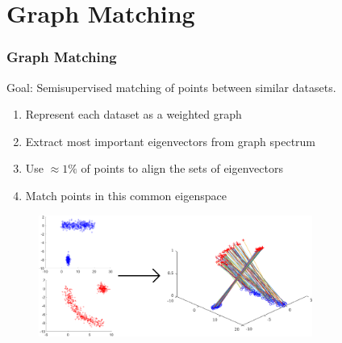 \documentclass{beamer}
\begin{document}
\section{Graph Matching}
\begin{frame}
  \frametitle{Graph Matching}
  Goal: Semisupervised matching of points between similar datasets.\\
  \begin{enumerate}
  \item Represent each dataset as a weighted graph
  \item Extract most important eigenvectors from graph spectrum
  \item Use $\approx 1\%$ of points to align the sets of eigenvectors
  \item Match points in this common eigenspace
  \end{enumerate}  
  \begin{figure}
    \centering
    \includegraphics[width = 0.8\textwidth]{./CombinePic/combinepic.png}
  \end{figure}
\end{frame}
\end{document}
